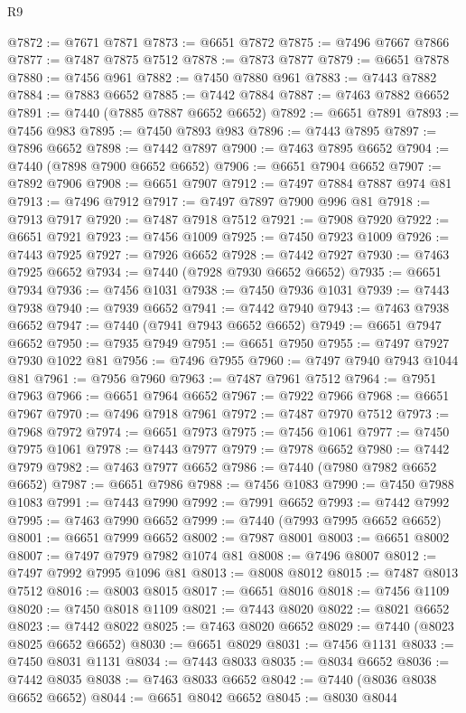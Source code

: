 \begin{lexlean}{R9}
\begin{coremodule}
@7872 := @7671 @7871
@7873 := @6651 @7872
@7875 := @7496 @7667 @7866
@7877 := @7487 @7875 @7512
@7878 := @7873 @7877
@7879 := @6651 @7878
@7880 := @7456 @961
@7882 := @7450 @7880 @961
@7883 := @7443 @7882
@7884 := @7883 @6652
@7885 := @7442 @7884
@7887 := @7463 @7882 @6652
@7891 := @7440 (@7885 @7887 @6652 @6652)
@7892 := @6651 @7891
@7893 := @7456 @983
@7895 := @7450 @7893 @983
@7896 := @7443 @7895
@7897 := @7896 @6652
@7898 := @7442 @7897
@7900 := @7463 @7895 @6652
@7904 := @7440 (@7898 @7900 @6652 @6652)
@7906 := @6651 @7904 @6652
@7907 := @7892 @7906
@7908 := @6651 @7907
@7912 := @7497 @7884 @7887 @974 @81
@7913 := @7496 @7912
@7917 := @7497 @7897 @7900 @996 @81
@7918 := @7913 @7917
@7920 := @7487 @7918 @7512
@7921 := @7908 @7920
@7922 := @6651 @7921
@7923 := @7456 @1009
@7925 := @7450 @7923 @1009
@7926 := @7443 @7925
@7927 := @7926 @6652
@7928 := @7442 @7927
@7930 := @7463 @7925 @6652
@7934 := @7440 (@7928 @7930 @6652 @6652)
@7935 := @6651 @7934
@7936 := @7456 @1031
@7938 := @7450 @7936 @1031
@7939 := @7443 @7938
@7940 := @7939 @6652
@7941 := @7442 @7940
@7943 := @7463 @7938 @6652
@7947 := @7440 (@7941 @7943 @6652 @6652)
@7949 := @6651 @7947 @6652
@7950 := @7935 @7949
@7951 := @6651 @7950
@7955 := @7497 @7927 @7930 @1022 @81
@7956 := @7496 @7955
@7960 := @7497 @7940 @7943 @1044 @81
@7961 := @7956 @7960
@7963 := @7487 @7961 @7512
@7964 := @7951 @7963
@7966 := @6651 @7964 @6652
@7967 := @7922 @7966
@7968 := @6651 @7967
@7970 := @7496 @7918 @7961
@7972 := @7487 @7970 @7512
@7973 := @7968 @7972
@7974 := @6651 @7973
@7975 := @7456 @1061
@7977 := @7450 @7975 @1061
@7978 := @7443 @7977
@7979 := @7978 @6652
@7980 := @7442 @7979
@7982 := @7463 @7977 @6652
@7986 := @7440 (@7980 @7982 @6652 @6652)
@7987 := @6651 @7986
@7988 := @7456 @1083
@7990 := @7450 @7988 @1083
@7991 := @7443 @7990
@7992 := @7991 @6652
@7993 := @7442 @7992
@7995 := @7463 @7990 @6652
@7999 := @7440 (@7993 @7995 @6652 @6652)
@8001 := @6651 @7999 @6652
@8002 := @7987 @8001
@8003 := @6651 @8002
@8007 := @7497 @7979 @7982 @1074 @81
@8008 := @7496 @8007
@8012 := @7497 @7992 @7995 @1096 @81
@8013 := @8008 @8012
@8015 := @7487 @8013 @7512
@8016 := @8003 @8015
@8017 := @6651 @8016
@8018 := @7456 @1109
@8020 := @7450 @8018 @1109
@8021 := @7443 @8020
@8022 := @8021 @6652
@8023 := @7442 @8022
@8025 := @7463 @8020 @6652
@8029 := @7440 (@8023 @8025 @6652 @6652)
@8030 := @6651 @8029
@8031 := @7456 @1131
@8033 := @7450 @8031 @1131
@8034 := @7443 @8033
@8035 := @8034 @6652
@8036 := @7442 @8035
@8038 := @7463 @8033 @6652
@8042 := @7440 (@8036 @8038 @6652 @6652)
@8044 := @6651 @8042 @6652
@8045 := @8030 @8044

\end{coremodule}
\end{lexlean}

